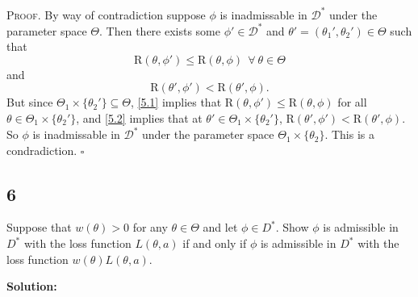 \documentclass[12pt]{article}
\newcounter{ProofCounter}
\newenvironment{Proof}{\stepcounter{ProofCounter}\textsc{Proof.}}{\hfill$\square$}
\begin{document}
\begin{Proof}
  By way of contradiction suppose $\phi$ is inadmissable in $\mathcal{D}^{*}$ under the parameter space $\Theta$. Then there exists some $\phi' \in
  \mathcal{D}^{*}$ and $\theta' = (\theta_1', \theta_2') \in \Theta$ such that 
  \begin{equation}
    \mathrm{R}(\theta, \phi') \leq \mathrm{R}(\theta, \phi) \ \ \forall \ \theta \in \Theta
    \label{5.1}
  \end{equation}
  and 
  \begin{equation}
    \mathrm{R}(\theta', \phi') < \mathrm{R}(\theta', \phi).
    \label{5.2}
  \end{equation}
  But since $\Theta_1 \times \{\theta_2'\} \subseteq \Theta$, \eqref{5.1} implies that $\mathrm{R}(\theta, \phi') \leq \mathrm{R}(\theta, \phi)$ for
  all $\theta \in \Theta_1 \times \{\theta_2'\}$, and \eqref{5.2} implies that at $\theta' \in \Theta_1 \times \{\theta_2'\}$, $\mathrm{R}(\theta',
  \phi') < \mathrm{R}(\theta', \phi)$. So $\phi$ is inadmissable in $\mathcal{D}^{*}$ under the parameter space $\Theta_1 \times \{\theta_2\}$.
  This is a condradiction.
\end{Proof}

\newpage
\subsection*{6}
\begin{tcolorbox}
  Suppose that $w(\theta)>0$ for any $\theta \in \Theta$ and let $\phi \in D^*$.  Show $\phi$ is admissible in $D^*$ with the loss function $L(\theta,a)$
  if and only if $\phi$ is admissible in $D^*$ with the loss function $w(\theta)L(\theta,a)$.
\end{tcolorbox}

\textbf{Solution:}
\end{document}
